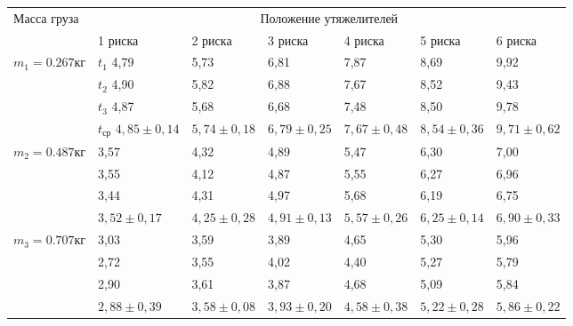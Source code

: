 \begin{center}
    \begin{tabular}{|p{2.5cm}|p{2cm}|p{2cm}|p{2cm}|p{2cm}|p{2cm}|p{2cm}|}
        \hline
        \multirow{2}{*}{Масса груза} & \multicolumn{6}{c|}{Положение утяжелителей} \\
        \cline{2-7}
        & 1 риска       & 2 риска & 3 риска & 4 риска & 5 риска & 6 риска \\
        \hline
        \multirow{4}{*}{$m_1 = 0.267 \text{кг}$} & $t_1$    4,79     &     5,73    &     6,81    &    7,87     &   8,69      &     9,92    \\
        \cline{2-7}
        & $t_2$    4,90     &     5,82    &     6,88    &     7,67    &     8,52    &    9,43     \\
        \cline{2-7}
        & $t_3$    4,87     &     5,68    &     6,68    &     7,48    &    8,50     &    9,78     \\
        \cline{2-7}
        & $t_\text{ср}$  $4,85 \pm 0,14$  &    $5,74 \pm 0,18$     &    $6,79 \pm 0,25$     &    $7,67 \pm 0,48$     &    $8,54 \pm 0,36$     &     $9,71 \pm 0,62$    \\
        \hline
        \multirow{4}{*}{$m_2 = 0.487 \text{кг}$} &       3,57        &     4,32    &    4,89     &     5,47    &     6,30    &     7,00    \\
        \cline{2-7}
        &       3,55        &     4,12    &     4,87    &     5,55    &     6,27    &   6,96      \\
        \cline{2-7}
        &       3,44        &     4,31    &     4,97    &     5,68    &    6,19     &   6,75     \\
        \cline{2-7}
        &      $3,52 \pm 0,17$         &    $4,25 \pm 0,28$     &    $4,91 \pm 0,13$     &   $5,57 \pm 0,26$      &     $6,25 \pm 0,14$    &     $6,90 \pm 0,33$    \\
        \hline
        \multirow{4}{*}{$m_3 = 0.707 \text{кг}$} &       3,03        &     3,59    &     3,89    &    4,65     &    5,30     &     5,96    \\
        \cline{2-7}
        &       2,72        &     3,55    &     4,02    &    4,40     &    5,27     &    5,79     \\
        \cline{2-7}
        &       2,90        &    3,61     &     3,87    &     4,68    &    5,09     &    5,84     \\
        \cline{2-7}
        &       $2,88 \pm 0,39$        &    $3,58 \pm 0,08$     &    $3,93 \pm 0,20$     &    $4,58 \pm 0,38$     &    $5,22 \pm 0,28$     &     $5,86 \pm 0,22$    \\

\end{tabular}
\end{center}
